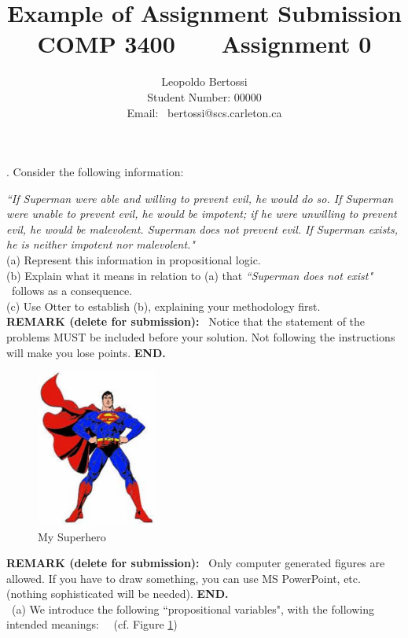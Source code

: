 \documentclass[fullpage]{article}
\title{\vspace*{-2cm}\bf Example of Assignment Submission\\COMP 3400 \ \ \ Assignment 0}
\author{Leopoldo Bertossi\\
Student Number: 00000\\ Email: \  bertossi@scs.carleton.ca}
\date{}
\newcommand{\comlb}[1]{{\vspace{2mm}\noindent \bf REMARK (delete for submission):}~ #1 \hfill {\bf
    END.}\\}
\begin{document}
\maketitle
\pagestyle{plain}
\thispagestyle{empty}

.  Consider the following information:

{\em ``If Superman were able and willing to prevent evil,
he would do so. If Superman were unable to prevent evil, he
would be impotent; if he were unwilling to prevent evil, he
would be malevolent. Superman does not prevent evil. If
Superman exists, he is neither impotent nor malevolent."}\\

\noindent (a) Represent this information in propositional logic.\\
(b) Explain what it means in relation to (a) that {\em ``Superman does not exist"} \ follows as a consequence.\\
(c) Use Otter to establish (b), explaining your methodology first. \\

\comlb{Notice that the statement of the problems MUST be included before your solution. Not following the instructions will make you lose
points.}


\begin{figure}[h]
\begin{center}
 \includegraphics[width=4cm]{superman.pdf}
 \caption{My Superhero}\label{fig:sup}
\end{center}
\end{figure}

\comlb{Only computer generated figures are allowed. If you have to draw something, you can use MS PowerPoint, etc. (nothing sophisticated will be needed).}


 \ (a)  We introduce the following ``propositional variables", with the following
intended meanings: \ \ (cf. Figure \ref{fig:sup})
\end{document}
